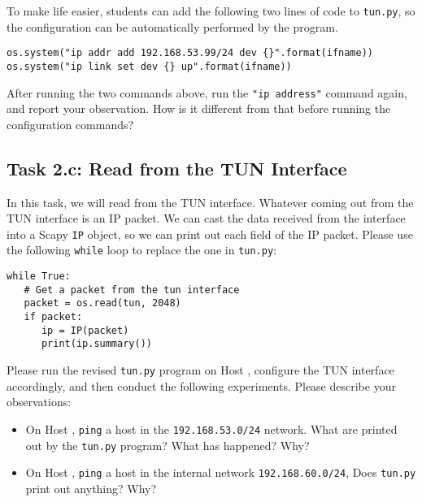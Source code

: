 To make life easier, students can add the following two lines of code
to \texttt{tun.py}, so the configuration can be automatically
performed by the program. 


\begin{lstlisting}
os.system("ip addr add 192.168.53.99/24 dev {}".format(ifname)) 
os.system("ip link set dev {} up".format(ifname))              
\end{lstlisting}



After running the two commands above, run the \texttt{"ip address"} command 
again, and report your observation. How is it different from
that before running the configuration commands?



\subsection{Task 2.c: Read from the TUN Interface}


In this task, we will read from the TUN interface. Whatever coming out from the TUN interface 
is an IP packet. We can cast the data received from the interface into a Scapy \texttt{IP} 
object, so we can print out each field of the IP packet. Please use the 
following \texttt{while} loop to replace the one in \texttt{tun.py}:  

\begin{lstlisting}
while True:
   # Get a packet from the tun interface
   packet = os.read(tun, 2048)
   if packet:
      ip = IP(packet)
      print(ip.summary())
\end{lstlisting}


Please run the revised \texttt{tun.py} program on Host \hostu, configure the 
TUN interface accordingly, and then 
conduct the following experiments. Please 
describe your observations: 


\begin{itemize}
\item On Host \hostu, \texttt{ping} a host in the \texttt{192.168.53.0/24} network. 
What are printed out by the \texttt{tun.py} program? What has happened? Why?   

\item On Host \hostu,  \texttt{ping} a host in the internal network \texttt{192.168.60.0/24}, 
Does \texttt{tun.py} print out anything? Why?   
\end{itemize}
 




